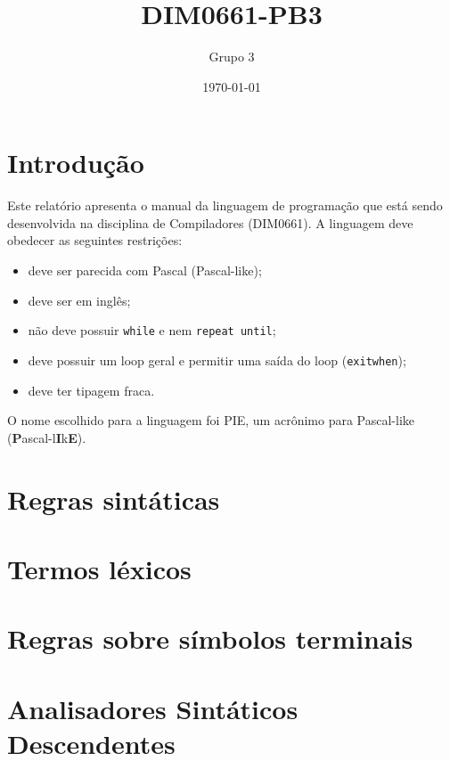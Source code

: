\documentclass[12pt]{report}
\title{DIM0661-PB3}
\author{Grupo 3}
\date{\today}
\begin{document}
\maketitle

\tableofcontents

\chapter{Introdução}
Este relatório apresenta o manual da linguagem de programação que está sendo desenvolvida na disciplina de Compiladores (DIM0661). A linguagem deve obedecer as seguintes restrições:

\begin{changemargin}{1cm}{1cm}
\begin{itemize}
    \item deve ser parecida com Pascal (Pascal-like);
    \item deve ser em inglês;
    \item não deve possuir \texttt{while} e nem \texttt{repeat until};
    \item deve possuir um loop geral e permitir uma saída do loop (\texttt{exitwhen});
    \item deve ter tipagem fraca.
\end{itemize}
\end{changemargin}

O nome escolhido para a linguagem foi PIE, um acrônimo para Pascal-like (\textbf{P}ascal-l\textbf{I}k\textbf{E}).

\chapter{Regras sintáticas}


\newpage
\chapter{Termos léxicos}


\newpage
\chapter{Regras sobre símbolos terminais}


\newpage
\chapter{Analisadores Sintáticos Descendentes}

\end{document}
